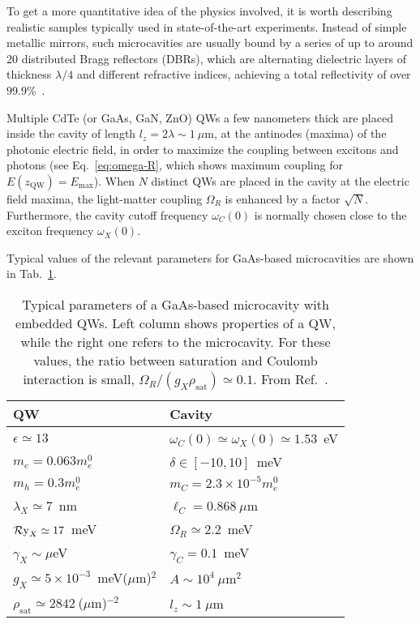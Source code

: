 To get a more quantitative idea of the physics involved, it is worth
describing realistic samples typically used in state-of-the-art
experiments. Instead of simple metallic mirrors, such microcavities
are usually bound by a series of up to around 20 distributed Bragg
reflectors (DBRs), which are alternating dielectric layers of
thickness $\lambda/4$ and different refractive indices, achieving a
total reflectivity of over $99.9$\%~\cite{9780199228942}. 

Multiple CdTe (or GaAs, GaN, ZnO) QWs a few nanometers thick are
placed inside the cavity of length $l_z = 2\lambda \sim 1~\mu$m, at
the antinodes (maxima) of the photonic electric field, in order to
maximize the coupling between excitons and photons (see
Eq.~\eqref{eq:omega-R}, which shows maximum coupling for
$E(z_{\text{QW}}) = E_{\text{max}}$). When $N$ distinct QWs are placed
in the cavity at the electric field maxima, the light-matter coupling
$\Omega_R$ is enhanced by a factor $\sqrt{N}$. Furthermore, the cavity
cutoff frequency $\omega_C(0)$ is normally chosen close to the exciton
frequency $\omega_X(0)$.

Typical values of the relevant parameters for GaAs-based
microcavities are shown in Tab.~\ref{tab:GaAs-params}. 
%
\begin{table}
  \centering
  \begin{tabular}{@{}ll@{}} \toprule
    QW & Cavity \\ \midrule
    $\epsilon \simeq 13$ &  $\omega_C(0) \simeq \omega_X(0) \simeq 1.53$~eV\\
    $m_e = 0.063m^0_e$    &  $\delta \in [-10,10]$~meV\\
    $m_h = 0.3m^0_e$      &  $m_{C} = 2.3\times 10^{-5} m^0_e$ \\
    $\lambda_X \simeq 7$~nm   & $\ell_{C} = 0.868~\mu$m\\
    $\operatorname{\mathcal{R}y}_X \simeq 17$~meV &  $\Omega_R \simeq 2.2$~meV \\
    $\gamma_X \sim \mu$eV &  $\gamma_C = 0.1$~meV \\ 
    $g_X \simeq 5\times10^{-3}$~meV($\mu$m)$^2$ &  $A \sim 10^4~\mu$m$^2$\\
    $\rho_{\text{sat}} \simeq 2842~$($\mu$m)$^{-2}$ &  $l_z \sim 1~\mu$m\\ \bottomrule
  \end{tabular}
  \caption{Typical parameters of a GaAs-based microcavity with
    embedded QWs. Left column shows properties of a QW, while the
    right one refers to the microcavity. For these values, the ratio
    between saturation and Coulomb interaction is small,
    $\Omega_R/(g_X \rho_{\text{sat}}) \simeq 0.1$. From
    Ref.~\cite{9783642241857}.}
  \label{tab:GaAs-params}
\end{table}
%


